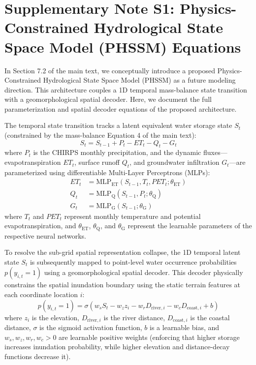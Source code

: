 

\newpage
\section*{Supplementary Note S1: Physics-Constrained Hydrological State Space Model (PHSSM) Equations}

In Section 7.2 of the main text, we conceptually introduce a proposed Physics-Constrained Hydrological State Space Model (PHSSM) as a future modeling direction. This architecture couples a 1D temporal mass-balance state transition with a geomorphological spatial decoder. Here, we document the full parameterization and spatial decoder equations of the proposed architecture.

The temporal state transition tracks a latent equivalent water storage state $S_t$ (constrained by the mass-balance Equation 4 of the main text):
\begin{equation}
    S_t = S_{t-1} + P_t - ET_t - Q_t - G_t
\end{equation}
where $P_t$ is the CHIRPS monthly precipitation, and the dynamic fluxes---evapotranspiration $ET_t$, surface runoff $Q_t$, and groundwater infiltration $G_t$---are parameterized using differentiable Multi-Layer Perceptrons (MLPs):
\begin{align}
    ET_t &= \text{MLP}_{\text{ET}}(S_{t-1}, T_t, PET_t; \theta_{\text{ET}}) \\
    Q_t  &= \text{MLP}_{\text{Q}}(S_{t-1}, P_t; \theta_{\text{Q}}) \\
    G_t  &= \text{MLP}_{\text{G}}(S_{t-1}; \theta_{\text{G}})
\end{align}
where $T_t$ and $PET_t$ represent monthly temperature and potential evapotranspiration, and $\theta_{\text{ET}}$, $\theta_{\text{Q}}$, and $\theta_{\text{G}}$ represent the learnable parameters of the respective neural networks.

To resolve the sub-grid spatial representation collapse, the 1D temporal latent state $S_t$ is subsequently mapped to point-level water occurrence probabilities $p(y_{i,t} = 1)$ using a geomorphological spatial decoder. This decoder physically constrains the spatial inundation boundary using the static terrain features at each coordinate location $i$:
\begin{equation}
    p(y_{i,t} = 1) = \sigma \left( w_s S_t - w_z z_i - w_r D_{\text{river}, i} - w_c D_{\text{coast}, i} + b \right)
\end{equation}
where $z_i$ is the elevation, $D_{\text{river}, i}$ is the river distance, $D_{\text{coast}, i}$ is the coastal distance, $\sigma$ is the sigmoid activation function, $b$ is a learnable bias, and $w_s, w_z, w_r, w_c > 0$ are learnable positive weights (enforcing that higher storage increases inundation probability, while higher elevation and distance-decay functions decrease it).

